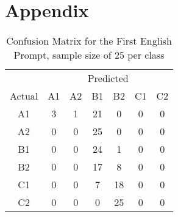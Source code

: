 \chapter{Appendix}
\label{ch:appendix}

\begin{table}[ht]
    \centering
    \begin{tabular}{c|cccccc}
        & \multicolumn{6}{c}{Predicted} \\
        Actual & A1 & A2 & B1 & B2 & C1 & C2 \\
        \hline
        A1 & \cellcolor[rgb]{0.9,1,0.9}3 & \cellcolor[rgb]{0.97,1,0.97}1 & \cellcolor[rgb]{0.2,0.8,0.2}21 & \cellcolor[rgb]{1,1,1}0 & \cellcolor[rgb]{1,1,1}0 & \cellcolor[rgb]{1,1,1}0 \\
        A2 & \cellcolor[rgb]{1,1,1}0 & \cellcolor[rgb]{1,1,1}0 & \cellcolor[rgb]{0.2,0.8,0.2}25 & \cellcolor[rgb]{1,1,1}0 & \cellcolor[rgb]{1,1,1}0 & \cellcolor[rgb]{1,1,1}0 \\
        B1 & \cellcolor[rgb]{1,1,1}0 & \cellcolor[rgb]{1,1,1}0 & \cellcolor[rgb]{0.22,0.81,0.22}24 & \cellcolor[rgb]{0.97,1,0.97}1 & \cellcolor[rgb]{1,1,1}0 & \cellcolor[rgb]{1,1,1}0 \\
        B2 & \cellcolor[rgb]{1,1,1}0 & \cellcolor[rgb]{1,1,1}0 & \cellcolor[rgb]{0.46,0.88,0.46}17 & \cellcolor[rgb]{0.68,0.93,0.68}8 & \cellcolor[rgb]{1,1,1}0 & \cellcolor[rgb]{1,1,1}0 \\
        C1 & \cellcolor[rgb]{1,1,1}0 & \cellcolor[rgb]{1,1,1}0 & \cellcolor[rgb]{0.72,0.95,0.72}7 & \cellcolor[rgb]{0.4,0.86,0.4}18 & \cellcolor[rgb]{1,1,1}0 & \cellcolor[rgb]{1,1,1}0 \\
        C2 & \cellcolor[rgb]{1,1,1}0 & \cellcolor[rgb]{1,1,1}0 & \cellcolor[rgb]{1,1,1}0 & \cellcolor[rgb]{0.2,0.8,0.2}25 & \cellcolor[rgb]{1,1,1}0 & \cellcolor[rgb]{1,1,1}0 \\
    \end{tabular}
    \caption{Confusion Matrix for the First English Prompt, sample size of 25 per class}
    \label{tab:first_english_prompt}
\end{table}

